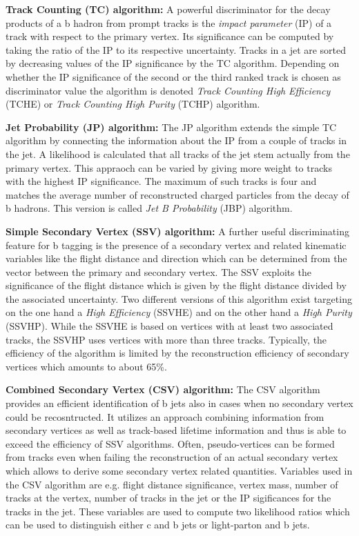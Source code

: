 \begin{description}
 \item \textbf{Track Counting (TC) algorithm:} A powerful discriminator for the decay products of a b hadron from prompt tracks is the \textit{impact parameter} (IP) of a track with respect to the primary vertex. Its significance can be computed by taking the ratio of the IP to its respective uncertainty. Tracks in a jet are sorted by decreasing values of the IP significance by the TC algorithm. Depending on whether the IP significance of the second or the third ranked track is chosen as discriminator value the algorithm is denoted \textit{Track Counting High Efficiency} (TCHE) or \textit{Track Counting High Purity} (TCHP) algorithm. 
 \item \textbf{Jet Probability (JP) algorithm:} The JP algorithm extends the simple TC algorithm by connecting the information about the IP from a couple of tracks in the jet. A likelihood is calculated that all tracks of the jet stem actually from the primary vertex. This appraoch can be varied by giving more weight to tracks with the highest IP significance. The maximum of such tracks is four and matches the average number of reconstructed charged particles from the decay of b hadrons. This version is called \textit{Jet B Probability} (JBP) algorithm.
 \item \textbf{Simple Secondary Vertex (SSV) algorithm:} A further useful discriminating feature for b tagging is the presence of a secondary vertex and related kinematic variables like the flight distance and direction which can be determined from the vector between the primary and secondary vertex. The SSV exploits the significance of the flight distance which is given by the flight distance divided by the associated uncertainty. Two different versions of this algorithm exist targeting on the one hand a \textit{High Efficiency} (SSVHE) and on the other hand a \textit{High Purity} (SSVHP). While the SSVHE is based on vertices with at least two associated tracks, the SSVHP uses vertices with more than three tracks. Typically, the efficiency of the algorithm is limited by the reconstruction efficiency of secondary vertices which amounts to about 65\%.  
 \item \textbf{Combined Secondary Vertex (CSV) algorithm:} The CSV algorithm provides an efficient identification of b jets also in cases when no secondary vertex could be recosntructed. It utilizes an approach combining information from secondary vertices as well as track-based lifetime information and thus is able to exceed the efficiency of SSV algorithms. Often, pseudo-vertices can be formed from tracks even when failing the reconstruction of an actual secondary vertex which allows to derive some secondary vertex related quantities. Variables used in the CSV algorithm are e.g. flight distance significance, vertex mass, number of tracks at the vertex, number of tracks in the jet or the IP sigificances for the tracks in the jet. These variables are used to compute two likelihood ratios which can be used to distinguish either c and b jets or light-parton and b jets. 
\end{description}  
